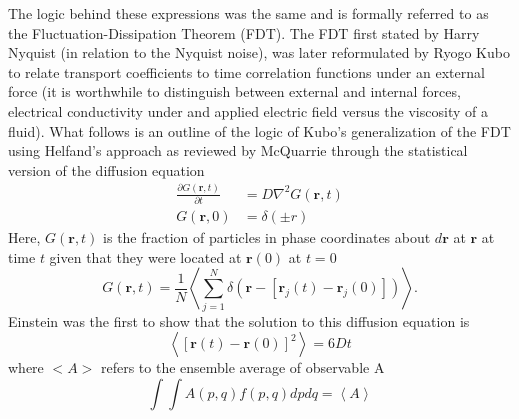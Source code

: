 The logic behind these expressions was the same and is formally referred to as the Fluctuation-Dissipation Theorem (FDT). The FDT first stated by Harry Nyquist (in relation to the Nyquist noise), was later reformulated by Ryogo Kubo to relate transport coefficients to time correlation functions \cite{JPSJ.12.570} under an external force (it is worthwhile to distinguish between external and internal forces, electrical conductivity under and applied electric field versus the viscosity of a fluid). \cite{zwanzig1965time} What follows is an outline of the logic of Kubo's generalization of the FDT using Helfand's approach as reviewed by McQuarrie\cite{mcquarrie} through the statistical version of the diffusion equation
%
\begin{equation}
\begin{split}
	\frac{\partial G(\bm{r},t)}{\partial t}&= D \nabla ^2G(\bm{r},t)\\
G(\bm{r},0)&=\delta(\pm{r})
\end{split}
\end{equation}
%
Here, $G(\bm{r},t)$ is the fraction of particles in phase coordinates about $d\bm{r}$ at $\bm{r}$ at time $t$ given that they were located at $\bm{r}(0)$ at $t=0$
%
\begin{equation}
G(\bm{r},t)= \frac{1}{N}\left<\sum_{j=1}^N\delta(\bm{r}-[\bm{r}_j(t)-\bm{r}_j(0)])\right>.
\end{equation}
%
Einstein was the first to show that the solution to this diffusion equation is \cite{}
%
\begin{equation}
\left<[\bm{r}(t)-\bm{r}(0)]^2\right>=6Dt
\end{equation}
%
%
%
where $<A>$ refers to the ensemble average of observable A
\begin{equation}
\int \int A(p,q) f(p,q) dpdq=\left<A\right>
\end{equation}
